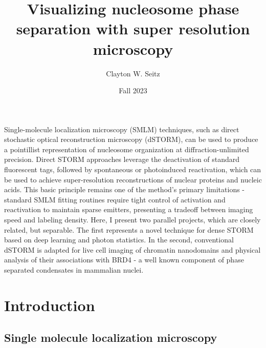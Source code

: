 \documentclass{ucetd}
\title{Visualizing nucleosome phase separation with super resolution microscopy}
\author{Clayton W. Seitz}
\date{Fall 2023}
\begin{document}
\maketitle



\tableofcontents


\abstract

Single-molecule localization microscopy (SMLM) techniques, such as direct stochastic optical reconstruction microscopy (dSTORM), can be used to produce a pointillist representation of nucleosome organization at diffraction-unlimited precision. Direct STORM approaches leverage the deactivation of standard fluorescent tags, followed by spontaneous or photoinduced reactivation, which can be used to achieve super-resolution reconstructions of nuclear proteins and nucleic acids. This basic principle remains one of the method's primary limitations - standard SMLM fitting routines require tight control of activation and reactivation to maintain sparse emitters, presenting a tradeoff between imaging speed and labeling density. Here, I present two parallel projects, which are closely related, but separable. The first represents a novel technique for dense STORM based on deep learning and photon statistics. In the second, conventional dSTORM is adapted for live cell imaging of chromatin nanodomains and physical analysis of their associations with BRD4 - a well known component of phase separated condensates in mammalian nuclei. 

\clearpage

\mainmatter



\section{Introduction}

\subsection{Single molecule localization microscopy}
\end{document}
